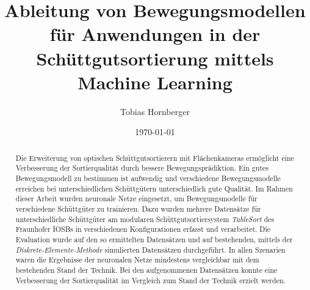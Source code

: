 \documentclass[german]{isasthesis}
\title{Ableitung von Bewegungsmodellen für Anwendungen in der Schüttgutsortierung mittels Machine Learning}
\author{Tobias Hornberger}
\date{\today}
\begin{document}
    \maketitle

    \begin{abstract}
    Die Erweiterung von optischen Schüttgutsortierern mit Flächenkameras ermöglicht eine Verbesserung der Sortierqualität durch bessere Bewegungsprädiktion.
    Ein gutes Bewegungsmodell zu bestimmen ist aufwendig und verschiedene Bewegungsmodelle erreichen bei unterschiedlichen Schüttgütern unterschiedlich gute Qualität.
    Im Rahmen dieser Arbeit wurden neuronale Netze eingesetzt, um Bewegungsmodelle für verschiedene Schüttgüter zu trainieren.
    Dazu wurden mehrere Datensätze für unterschiedliche Schüttgüter 
    am modularen Schüttgutsortiersystem \textit{TableSort} des Fraunhofer IOSBs in verschiedenen Konfigurationen erfasst und verarbeitet.
    Die Evaluation wurde auf den so ermittelten Datensätzen und auf bestehenden, mittels der \textit{Diskrete-Elemente-Methode} simulierten Datensätzen durchgeführt.
    In allen Szenarien waren die Ergebnisse der neuronalen Netze mindestens vergleichbar mit dem bestehenden Stand der Technik.
    Bei den aufgenommenen Datensätzen konnte eine Verbesserung der Sortierqualität im Vergleich zum Stand der Technik erzielt werden. 
    \end{abstract}

    \maketoc

    
    
    
    
    
    
    


	\cleardoublepage
    \printbibliography %


    \appendix
    

    
\end{document}
